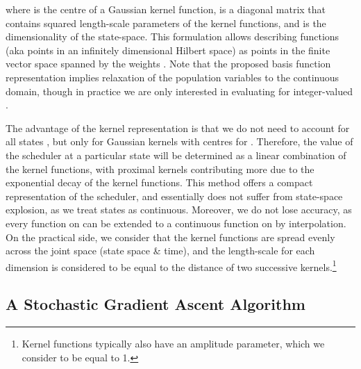 where  is the centre of a Gaussian kernel function,  is a diagonal matrix that contains  squared length-scale parameters of the kernel functions, and  is the dimensionality of the state-space.
This formulation allows describing functions (aka points in an infinitely dimensional Hilbert space) as points in the finite vector space spanned by the weights .
Note that the proposed basis function representation implies relaxation of the population variables to the continuous domain, though in  practice we are only interested in evaluating  for integer-valued . 

The advantage of the kernel representation is that we do not need to account for all states , but only for  Gaussian kernels with centres  for .
Therefore, the value of the scheduler at a particular state  will be determined as a linear combination of the kernel functions, with proximal kernels contributing more due to the exponential decay of the kernel functions.
This method offers a compact representation of the scheduler, and essentially does not suffer from state-space explosion, as we treat states as continuous. Moreover, we do not lose accuracy, as every function on  can be extended to a continuous function on  by interpolation.
On the practical side, we consider that the kernel functions are spread evenly across the joint space (state space \& time), and the length-scale for each dimension is considered to be equal to the distance of two successive kernels.\footnote{Kernel functions typically also have an amplitude parameter, which we consider to be equal to 1.}




\subsection{A Stochastic Gradient Ascent Algorithm}


